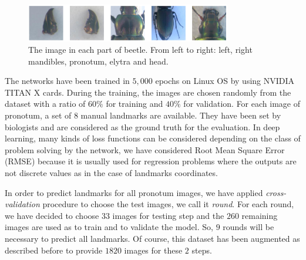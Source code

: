 \documentclass[review]{elsarticle}
\begin{document}
\begin{figure}[h]
	\centering
	\includegraphics[width=0.8\textwidth]{images/images5parts}
	\caption{The image in each part of beetle. From left to right:
          left, right mandibles, pronotum, elytra and head.}
	\label{fig5parts}
\end{figure}
The networks have been trained in $5, 000$ epochs on Linux OS by using
NVIDIA TITAN X cards. During the training, the images are chosen
randomly from the dataset with a ratio of $60\%$ for training and
$40\%$ for validation. For each image of pronotum, a set of $8$ manual
landmarks are available. They have been set by biologists and are
considered as the ground truth for the evaluation. In deep learning,
many kinds of loss functions can be considered depending on the
class of problem solving by the network, we have considered Root Mean
Square Error (RMSE) because it is usually used for regression problems
where the outputs are not discrete values as in the case of landmarks coordinates.

In order to predict landmarks for all pronotum images, we have applied
\textit{cross-validation} procedure to choose the test images, we call
it \textit{round}. For each round, we have decided to choose $33$
images for testing step and the $260$ remaining images are used as
to train and to validate the model. So, $9$ rounds will be necessary to predict
all landmarks. Of course, this dataset has been
augmented as described before to provide $1820$ images for these $2$
steps.
\end{document}

